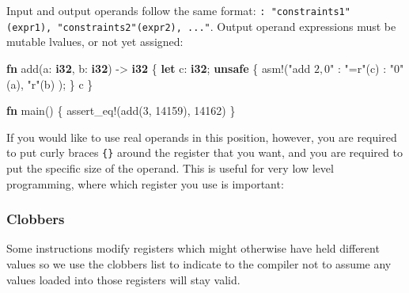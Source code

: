 \documentclass[a4paper,]{book}
\newenvironment{Shaded}{\begin{snugshade}}{\end{snugshade}}
\newcommand{\KeywordTok}[1]{\textcolor[rgb]{0.13,0.29,0.53}{\textbf{{#1}}}}
\newcommand{\DecValTok}[1]{\textcolor[rgb]{0.00,0.00,0.81}{{#1}}}
\newcommand{\StringTok}[1]{\textcolor[rgb]{0.31,0.60,0.02}{{#1}}}
\newcommand{\OtherTok}[1]{\textcolor[rgb]{0.56,0.35,0.01}{{#1}}}
\newcommand{\NormalTok}[1]{{#1}}
\begin{document}
Input and output operands follow the same format:
\texttt{:\ "constraints1"(expr1),\ "constraints2"(expr2),\ ..."}. Output
operand expressions must be mutable lvalues, or not yet assigned:

\begin{Shaded}
\begin{Highlighting}[]
\KeywordTok{fn} \NormalTok{add(a: }\KeywordTok{i32}\NormalTok{, b: }\KeywordTok{i32}\NormalTok{) -> }\KeywordTok{i32} \NormalTok{\{}
    \KeywordTok{let} \NormalTok{c: }\KeywordTok{i32}\NormalTok{;}
    \KeywordTok{unsafe} \NormalTok{\{}
        \OtherTok{asm!}\NormalTok{(}\StringTok{"add $2, $0"}
             \NormalTok{: }\StringTok{"=r"}\NormalTok{(c)}
             \NormalTok{: }\StringTok{"0"}\NormalTok{(a), }\StringTok{"r"}\NormalTok{(b)}
             \NormalTok{);}
    \NormalTok{\}}
    \NormalTok{c}
\NormalTok{\}}

\KeywordTok{fn} \NormalTok{main() \{}
    \OtherTok{assert_eq!}\NormalTok{(add(}\DecValTok{3}\NormalTok{, }\DecValTok{14159}\NormalTok{), }\DecValTok{14162}\NormalTok{)}
\NormalTok{\}}
\end{Highlighting}
\end{Shaded}

If you would like to use real operands in this position, however, you
are required to put curly braces \texttt{\{\}} around the register that
you want, and you are required to put the specific size of the operand.
This is useful for very low level programming, where which register you
use is important:

\begin{Shaded}
\end{Shaded}

\subsubsection{Clobbers}\label{clobbers}

Some instructions modify registers which might otherwise have held
different values so we use the clobbers list to indicate to the compiler
not to assume any values loaded into those registers will stay valid.
\end{document}
